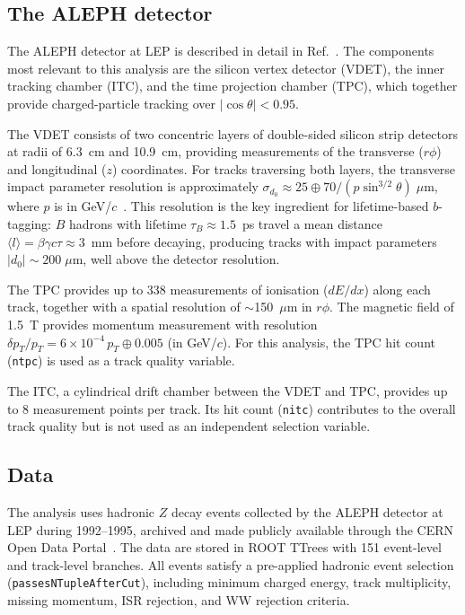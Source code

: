 \documentclass[11pt,a4paper]{article}
\begin{document}
\subsection{The ALEPH detector}
\label{sec:data:detector}

The ALEPH detector at LEP is described in detail
in Ref.~\cite{ALEPH:sigma_had}.
The components most relevant to this analysis are the silicon
vertex detector (VDET), the inner tracking chamber (ITC), and
the time projection chamber (TPC), which together provide
charged-particle tracking over $|\cos\theta| < 0.95$.

The VDET consists of two concentric layers of double-sided silicon
strip detectors at radii of 6.3~cm and 10.9~cm, providing
measurements of the transverse ($r\phi$) and longitudinal ($z$)
coordinates.
For tracks traversing both layers, the transverse impact parameter
resolution is approximately
$\sigma_{d_0} \approx 25 \oplus 70/(p\sin^{3/2}\theta)\;\mu$m,
where $p$ is in GeV/$c$~\cite{ALEPH:Rb:precise}.
This resolution is the key ingredient for lifetime-based $b$-tagging:
$B$ hadrons with lifetime $\tau_B \approx 1.5$~ps travel a mean
distance $\langle l \rangle = \beta\gamma c\tau \approx 3$~mm
before decaying, producing tracks with impact parameters
$|d_0| \sim 200\;\mu$m, well above the detector resolution.

The TPC provides up to 338 measurements of ionisation ($dE/dx$)
along each track, together with a spatial resolution of
$\sim$150~$\mu$m in $r\phi$.
The magnetic field of 1.5~T provides momentum measurement with
resolution $\delta p_T / p_T = 6 \times 10^{-4}\, p_T \oplus
0.005$ (in GeV/$c$).
For this analysis, the TPC hit count (\texttt{ntpc}) is used as
a track quality variable.

The ITC, a cylindrical drift chamber between the VDET and TPC,
provides up to 8 measurement points per track.
Its hit count (\texttt{nitc}) contributes to the overall track
quality but is not used as an independent selection variable.

\subsection{Data}
\label{sec:data:data}

The analysis uses hadronic $Z$ decay events collected by the ALEPH
detector at LEP during 1992--1995, archived and made publicly
available through the CERN Open Data Portal~\cite{ALEPH:opendata}.
The data are stored in ROOT TTrees with 151 event-level and
track-level branches.
All events satisfy a pre-applied hadronic event selection
(\texttt{passesNTupleAfterCut}), including minimum charged energy,
track multiplicity, missing momentum, ISR rejection, and WW rejection
criteria.
\end{document}

